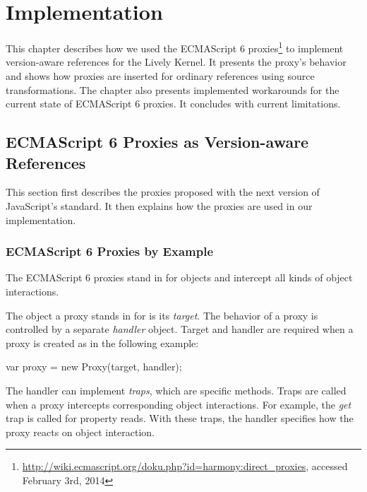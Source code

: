 

\chapter{Implementation} \label{chapter:IMPLEMENTATION}

This chapter describes how we used the ECMAScript 6 proxies\footnote{\url{http://wiki.ecmascript.org/doku.php?id=harmony:direct_proxies}, accessed February 3rd, 2014} to implement version-aware references for the Lively Kernel.
It presents the proxy's behavior and shows how proxies are inserted for ordinary references using source transformations.
The chapter also presents implemented workarounds for the current state of ECMAScript 6 proxies.
It concludes with current limitations.

\section{ECMAScript 6 Proxies as Version-aware References} \label{sec:IMPLEMENTATION:1}

This section first describes the proxies proposed with the next version of JavaScript's standard.
It then explains how the proxies are used in our implementation.

\subsection{ECMAScript 6 Proxies by Example} \label{subsec:IMPLEMENTATION:1.1}

The ECMAScript 6 proxies stand in for objects and intercept all kinds of object interactions.

The object a proxy stands in for is its \emph{target}.
The behavior of a proxy is controlled by a separate \emph{handler} object.
Target and handler are required when a proxy is created as in the following example:

\begin{code}{}{}
var proxy = new Proxy(target, handler);
\end{code}
\iffalse
\end{verbatim}\fi

The handler can implement \emph{traps}, which are specific methods.
Traps are called when a proxy intercepts corresponding object interactions.
For example, the \emph{get} trap is called for property reads.
With these traps, the handler specifies how the proxy reacts on object interaction.

